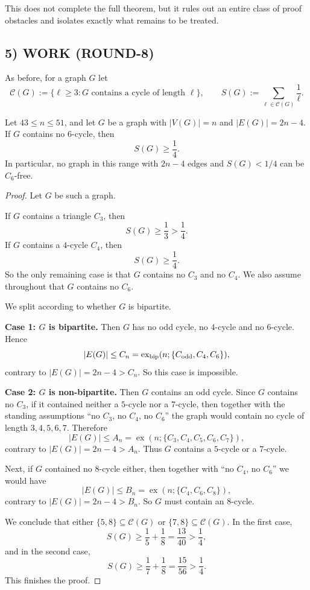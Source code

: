 This does not complete the full theorem, but it rules out an entire class of proof obstacles and isolates exactly what remains to be treated.

\subsection*{5) WORK (ROUND-8)}

As before, for a graph $G$ let
\[
\mathcal C(G):=\{\ell\ge 3 : \text{$G$ contains a cycle of length $\ell$}\},
\qquad
S(G):=\sum_{\ell\in\mathcal C(G)}\frac1\ell.
\]

\begin{theorem}\label{thm:noC6}
Let $43\le n\le 51$, and let $G$ be a graph with $|V(G)|=n$ and $|E(G)|=2n-4$.
If $G$ contains no $6$-cycle, then
\[
S(G)\ge \frac14.
\]
In particular, no graph in this range with $2n-4$ edges and $S(G)<1/4$ can be $C_6$-free.
\end{theorem}

\begin{proof}
Let $G$ be such a graph.

If $G$ contains a triangle $C_3$, then
\[
S(G)\ge \frac13>\frac14.
\]
If $G$ contains a $4$-cycle $C_4$, then
\[
S(G)\ge \frac14.
\]
So the only remaining case is that $G$ contains no $C_3$ and no $C_4$.
We also assume throughout that $G$ contains no $C_6$.

We split according to whether $G$ is bipartite.

\medskip
\noindent\textbf{Case 1: $G$ is bipartite.}
Then $G$ has no odd cycle, no $4$-cycle and no $6$-cycle.
Hence
\[
|E(G)|\le C_n=\operatorname{ex}_{\rm bip}(n;\{C_{\mathrm{odd}},C_4,C_6\}),
\]
contrary to $|E(G)|=2n-4>C_n$.
So this case is impossible.

\medskip
\noindent\textbf{Case 2: $G$ is non-bipartite.}
Then $G$ contains an odd cycle.
Since $G$ contains no $C_3$, if it contained neither a $5$-cycle nor a $7$-cycle, then together with the standing assumptions ``no $C_3$, no $C_4$, no $C_6$'' the graph would contain no cycle of length $3,4,5,6,7$.
Therefore
\[
|E(G)|\le A_n=\operatorname{ex}(n;\{C_3,C_4,C_5,C_6,C_7\}),
\]
contrary to $|E(G)|=2n-4>A_n$.
Thus $G$ contains a $5$-cycle or a $7$-cycle.

Next, if $G$ contained no $8$-cycle either, then together with ``no $C_4$, no $C_6$'' we would have
\[
|E(G)|\le B_n=\operatorname{ex}(n;\{C_4,C_6,C_8\}),
\]
contrary to $|E(G)|=2n-4>B_n$.
So $G$ must contain an $8$-cycle.

We conclude that either $\{5,8\}\subseteq\mathcal C(G)$ or $\{7,8\}\subseteq\mathcal C(G)$.
In the first case,
\[
S(G)\ge \frac15+\frac18=\frac{13}{40}>\frac14,
\]
and in the second case,
\[
S(G)\ge \frac17+\frac18=\frac{15}{56}>\frac14.
\]
This finishes the proof.
\end{proof}


